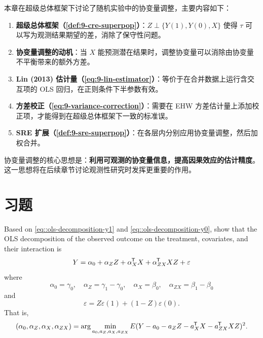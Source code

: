 本章在超级总体框架下讨论了随机实验中的协变量调整，主要内容如下：

\begin{enumerate}
  \item \textbf{超级总体框架（\cref{def:9-cre-superpop}）}：$Z \perp \{Y(1), Y(0), X\}$ 使得 $\tau$ 可以写为观测结果期望的差，消除了保守性问题。
  \item \textbf{协变量调整的动机}：当 $X$ 能预测潜在结果时，调整协变量可以消除由协变量不平衡带来的额外方差。
  \item \textbf{Lin (2013) 估计量（\cref{eq:9-lin-estimator}）}：等价于在合并数据上运行含交互项的 OLS 回归，在正则条件下半参数有效。
  \item \textbf{方差校正（\cref{eq:9-variance-correction}）}：需要在 EHW 方差估计量上添加校正项，才能得到在超级总体框架下一致的标准误。
  \item \textbf{SRE 扩展（\cref{def:9-sre-superpop}）}：在各层内分别应用协变量调整，然后加权合并。
\end{enumerate}

协变量调整的核心思想是：\textbf{利用可观测的协变量信息，提高因果效应的估计精度}。这一思想将在后续章节讨论观测性研究时发挥更重要的作用。

\section{习题}\label{sec:9-homework}

\begin{HomeworkProblem}\label{exr:9-1}

Based on \eqref{eq::ols-decomposition-y1} and \eqref{eq::ols-decomposition-y0}, show that the OLS decomposition of the observed outcome on the treatment, covariates, and their interaction is
\[
Y= \alpha_0 + \alpha_Z  Z +
\alpha_X ^{\mkern-1.5mu\mathsf{T}} X + \alpha_{ZX} ^{\mkern-1.5mu\mathsf{T}} X Z + \varepsilon
\]
where
\[
\alpha_0 = \gamma_0 ,\quad
\alpha_Z = \gamma_1 - \gamma_0,\quad
\alpha_X  =  \beta_0, \quad
\alpha_{ZX} = \beta_1 - \beta_0
\]
and
\[
\varepsilon  = Z \varepsilon (1) + (1-Z) \varepsilon (0).
\]
That is,
\[
(\alpha_0, \alpha_Z, \alpha_X , \alpha_{ZX} )
=\arg\min_{a_0, a_Z, a_X, a_{ZX}   }  E  (  Y - a_0 - a_Z Z - a_X^{\mkern-1.5mu\mathsf{T}} X -a_{ZX} ^{\mkern-1.5mu\mathsf{T}} X Z)^2.
\]


\end{HomeworkProblem}

